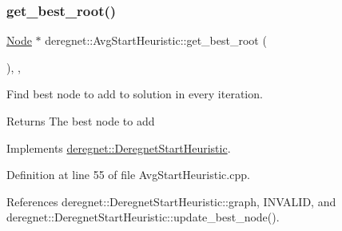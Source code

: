 \mbox{\label{classderegnet_1_1AvgStartHeuristic_ac13190b98b5611ad231fe3d9447431fb}} 
\subsubsection{\texorpdfstring{get\+\_\+best\+\_\+root()}{get\_best\_root()}}
{\footnotesize\ttfamily \hyperlink{namespacederegnet_a744bad34f2de9856d36715a445f027f3}{Node} $\ast$ deregnet\+::\+Avg\+Start\+Heuristic\+::get\+\_\+best\+\_\+root (\begin{DoxyParamCaption}{ }\end{DoxyParamCaption})\hspace{0.3cm}{\ttfamily [override]}, {\ttfamily [private]}, {\ttfamily [virtual]}}



Find best node to add to solution in every iteration. 

\begin{DoxyReturn}{Returns}
The best node to add 
\end{DoxyReturn}


Implements \hyperlink{classderegnet_1_1DeregnetStartHeuristic_a372be86d0fb8ac94bd926a1f4d09e102}{deregnet\+::\+Deregnet\+Start\+Heuristic}.



Definition at line 55 of file Avg\+Start\+Heuristic.\+cpp.



References deregnet\+::\+Deregnet\+Start\+Heuristic\+::graph, I\+N\+V\+A\+L\+ID, and deregnet\+::\+Deregnet\+Start\+Heuristic\+::update\+\_\+best\+\_\+node().


